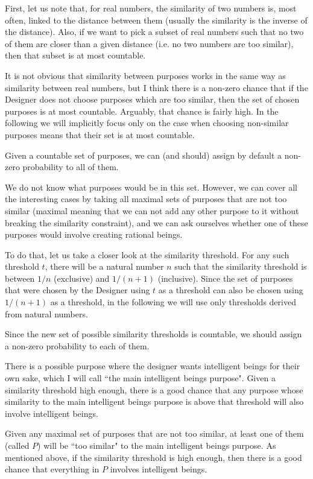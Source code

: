 \documentclass[a4paper
,draft
]{article}
\newcommand{\ghilimele}[1]{``#1"}
\begin{document}
First, let us note that, for real numbers, the similarity of two numbers
is, most often, linked to the distance between them
(usually the similarity is the inverse of the distance).
Also, if we want to pick a subset of real numbers such that no two of them are
closer than a given distance (i.e. no two numbers are too similar),
then that subset is at most countable.

It is not obvious that
similarity between purposes works in the same way as similarity between
real numbers, but I think there is a non-zero chance
that if the Designer does not choose purposes which are too similar,
then the set of chosen purposes is at most countable.
Arguably, that chance is fairly high.
In the following we will implicitly focus only on the case when choosing
non-similar purposes means that their set is at most countable.

Given a countable set of purposes, we can (and should) assign by default
a non-zero probability to all of them.

We do not know what purposes would be in this set.
However, we can cover all the interesting cases by taking all maximal sets of
purposes that are not too similar
(maximal meaning that we can not add any other purpose to it without breaking
the similarity constraint), and we can ask ourselves whether one of these
purposes would involve creating rational beings.

To do that, let us take a closer look at the similarity threshold.
For any such threshold $t$,
there will be a natural number $n$ such that the similarity threshold is between
$1/n$ (exclusive) and $1/(n+1)$ (inclusive).
Since the set of purposes that were chosen by the Designer using $t$ as a
threshold can also be chosen
using $1/(n+1)$ as a threshold, in the following we will use only
thresholds derived from natural numbers.

Since the new set of possible similarity thresholds is countable,
we should assign a non-zero probability to each of them.

There is a possible purpose where the designer wants intelligent beings
for their own sake, which I will call
\ghilimele{the main intelligent beings purpose}.
Given a similarity threshold
high enough, there is a good chance that any purpose whose similarity to the
main intelligent beings purpose is above that threshold will also involve
intelligent beings.

Given any maximal set of purposes that are not too similar, at least one
of them (called $P$) will be \ghilimele{too similar} to the main intelligent
beings purpose.
As mentioned above, if the similarity threshold is high enough, then there is
a good chance that everything in $P$ involves intelligent beings.
\end{document}
